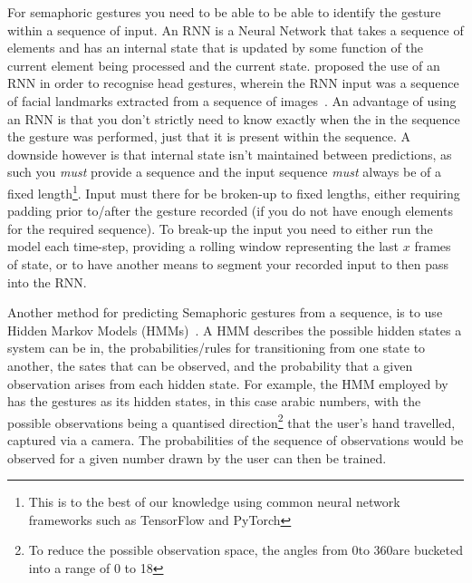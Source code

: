 For semaphoric gestures you need to be able to be able to identify the gesture within a sequence of input.
An RNN is a Neural Network that takes a sequence of elements and has an internal state that is updated by some function of the current element being processed and the current state.
\citeauthor{sharma2018recognizing} proposed the use of an RNN in order to recognise head gestures, wherein the RNN input was a sequence of facial landmarks extracted from a sequence of images~\cite{sharma2018recognizing}. 
An advantage of using an RNN is that you don't strictly need to know exactly when the in the sequence the gesture was performed, just that it is present within the sequence.
A downside however is that internal state isn't maintained between predictions, as such you \textit{must} provide a sequence and the input sequence \textit{must} always be of a fixed length\footnote{This is to the best of our knowledge using common neural network frameworks such as TensorFlow and PyTorch}. Input must there for be broken-up to fixed lengths, either requiring padding prior to/after the gesture recorded (if you do not have enough elements for the required sequence). To break-up the input you need to either run the model each time-step, providing a rolling window representing the last $x$ frames of state, or to have another means to segment your recorded input to then pass into the RNN.

Another method for predicting Semaphoric gestures from a sequence, is to use Hidden Markov Models (HMMs)~\cite{elmezain2008hidden, terven2014robust}.
A HMM describes the possible hidden states a system can be in, the probabilities/rules for transitioning from one state to another, the sates that can be observed, and the probability that a given observation arises from each hidden state.
For example, the HMM employed by \citeauthor{elmezain2008hidden}~\cite{elmezain2008hidden} has the gestures as its hidden states, in this case arabic numbers, with the possible observations being a quantised direction\footnote{To reduce the possible observation space, the angles from 0\textdegree to 360\textdegree are bucketed into a range of 0 to 18} that the user's hand travelled, captured via a camera. The probabilities of the sequence of observations would be observed for a given number drawn by the user can then be trained.

